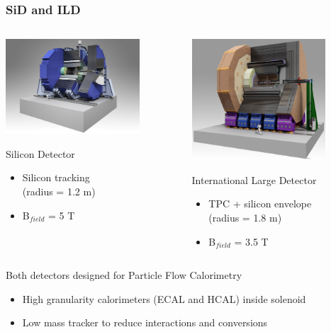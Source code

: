 \documentclass{beamer}
\begin{document}

\begin{frame}
  \frametitle{SiD and ILD}

  \begin{columns}[t]
    \begin{column}{5cm}
      \includegraphics[width = 5cm, height = 2.9 cm]{Pictures/ILC_SiD.jpg}
      \vspace{-0.25cm}
      \begin{block}{Silicon Detector}
        \footnotesize{
        \begin{itemize}
          \item Silicon tracking \\ (radius = 1.2 m)
          \item B$_{field}$ = 5 T
        \end{itemize}
        }
      \end{block}
    \end{column}

    \begin{column}{5cm}
      \includegraphics[width = 5cm, height = 2.9 cm]{Pictures/ILD_all_110826.jpg}
      \vspace{-0.25cm}
      \begin{block}{International Large Detector}
        \footnotesize{
        \begin{itemize}
          \item TPC + silicon envelope \\ (radius = 1.8 m)
          \item B$_{field}$ = 3.5 T
        \end{itemize}
        }
      \end{block}
    \end{column}
  \end{columns}

  \begin{block}{Both detectors designed for Particle Flow Calorimetry}
    \footnotesize{
    \begin{itemize}
      \item High granularity calorimeters (ECAL and HCAL) inside solenoid
      \item Low mass tracker to reduce interactions and conversions
    \end{itemize}
    }
  \end{block}
  
\end{frame}
\end{document}
